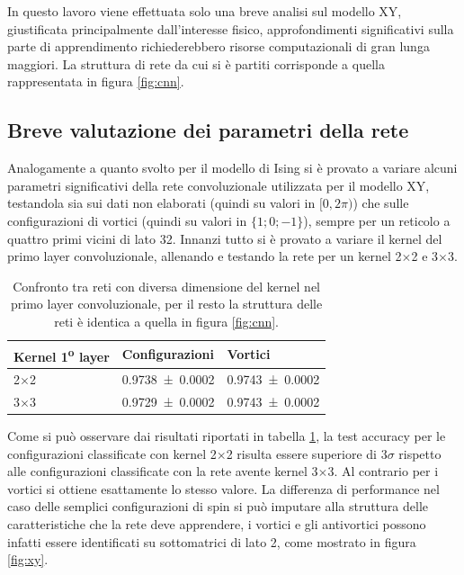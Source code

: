\documentclass{article}
\begin{document}
In questo lavoro viene effettuata solo una breve analisi sul modello XY, giustificata principalmente dall'interesse fisico, approfondimenti significativi sulla parte di apprendimento richiederebbero risorse computazionali di gran lunga maggiori.
La struttura di rete da cui si è partiti corrisponde a quella rappresentata in figura \ref{fig:cnn}.

\subsection{Breve valutazione dei parametri della rete}
Analogamente a quanto svolto per il modello di Ising si è provato a variare alcuni parametri significativi della rete convoluzionale utilizzata per il modello XY, testandola sia sui dati non elaborati (quindi su valori in $[0, 2\pi)$) che sulle configurazioni di vortici (quindi su valori in $\{1;0;-1\}$), sempre per un reticolo a quattro primi vicini di lato 32.
Innanzi tutto si è provato a variare il kernel del primo layer convoluzionale, allenando e testando la rete per un kernel 2$\times$2 e 3$\times$3.

\begin{table}[ht]
\begin{center}
\begin{tabular}{lll}
\toprule
Kernel 1\textsuperscript{o} layer & Configurazioni & Vortici \\
\midrule
2$\times$2 &\num{0.9738 \pm 0.0002} & \num{0.9743 \pm 0.0002}\\
3$\times$3 & \num{0.9729 \pm 0.0002} &\num{0.9743 \pm 0.0002}\\
\bottomrule
\end{tabular}
\end{center}
\caption{Confronto tra reti con diversa dimensione del kernel nel primo layer convoluzionale, per il resto la struttura delle reti è identica a quella in figura \ref{fig:cnn}.}
\label{tab:2x2vs3x3}
\end{table}

Come si può osservare dai risultati riportati in tabella \ref{tab:2x2vs3x3}, la test accuracy per le configurazioni classificate con kernel 2$\times$2 risulta essere superiore di $3\sigma$ rispetto alle configurazioni classificate con la rete avente kernel 3$\times$3. Al contrario per i vortici si ottiene esattamente lo stesso valore.
La differenza di performance nel caso delle semplici configurazioni di spin si può imputare alla struttura delle caratteristiche che la rete deve apprendere, i vortici e gli antivortici possono infatti essere identificati su sottomatrici di lato 2, come mostrato in figura \ref{fig:xy}.
\end{document}
